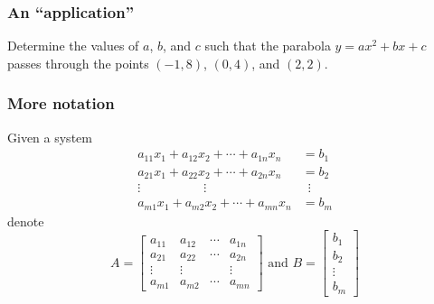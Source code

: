 \documentclass[12pt,t]{beamer}
\begin{document}
\begin{frame}\frametitle{An ``application''}
 \begin{example}
  Determine the values of $a$, $b$, and $c$ such that the parabola $y=ax^2+bx+c$ passes through the points $(-1,8)$, $(0,4)$, and $(2,2)$.
 \end{example}

\end{frame}
\begin{frame}\frametitle{More notation}
 Given a system 
\begin{align*}
 a_{11}x_1+a_{12}x_2+\cdots + a_{1n}x_n & = b_1\\
 a_{21}x_1+a_{22}x_2+\cdots + a_{2n}x_n & = b_2\\
 \vdots \hspace{60pt} \vdots \hspace{48pt} & \hspace{6pt}\vdots\\
 a_{m1}x_1+a_{m2}x_2+\cdots + a_{mn}x_n & = b_m
\end{align*}
denote
\[
 A = \begin{bmatrix}a_{11} & a_{12} & \cdots & a_{1n}\\a_{21} & a_{22} & \cdots & a_{2n}\\ \vdots & \vdots & & \vdots\\a_{m1} & a_{m2} & \cdots & a_{mn}\end{bmatrix} \text{ and } B = \begin{bmatrix}b_1\\b_2\\ \vdots \\b_m\end{bmatrix}
\]

\end{frame}
\end{document}
